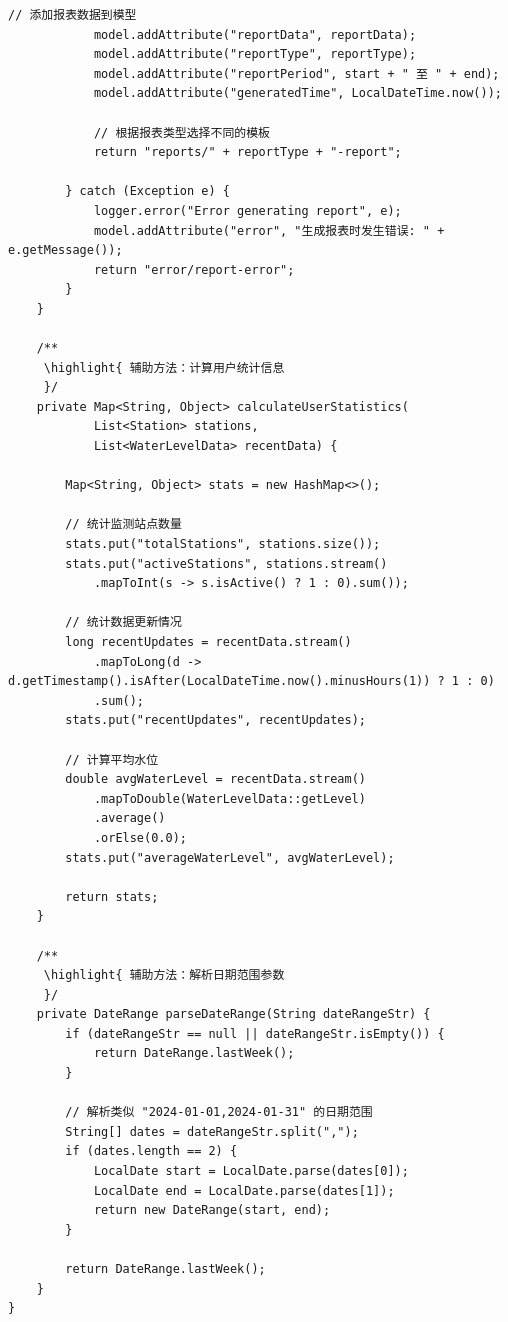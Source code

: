 \begin{lstlisting}[style=java]
            // 添加报表数据到模型
            model.addAttribute("reportData", reportData);
            model.addAttribute("reportType", reportType);
            model.addAttribute("reportPeriod", start + " 至 " + end);
            model.addAttribute("generatedTime", LocalDateTime.now());
            
            // 根据报表类型选择不同的模板
            return "reports/" + reportType + "-report";
            
        } catch (Exception e) {
            logger.error("Error generating report", e);
            model.addAttribute("error", "生成报表时发生错误: " + e.getMessage());
            return "error/report-error";
        }
    }
    
    /**
     \highlight{ 辅助方法：计算用户统计信息
     }/
    private Map<String, Object> calculateUserStatistics(
            List<Station> stations, 
            List<WaterLevelData> recentData) {
        
        Map<String, Object> stats = new HashMap<>();
        
        // 统计监测站点数量
        stats.put("totalStations", stations.size());
        stats.put("activeStations", stations.stream()
            .mapToInt(s -> s.isActive() ? 1 : 0).sum());
        
        // 统计数据更新情况
        long recentUpdates = recentData.stream()
            .mapToLong(d -> d.getTimestamp().isAfter(LocalDateTime.now().minusHours(1)) ? 1 : 0)
            .sum();
        stats.put("recentUpdates", recentUpdates);
        
        // 计算平均水位
        double avgWaterLevel = recentData.stream()
            .mapToDouble(WaterLevelData::getLevel)
            .average()
            .orElse(0.0);
        stats.put("averageWaterLevel", avgWaterLevel);
        
        return stats;
    }
    
    /**
     \highlight{ 辅助方法：解析日期范围参数
     }/
    private DateRange parseDateRange(String dateRangeStr) {
        if (dateRangeStr == null || dateRangeStr.isEmpty()) {
            return DateRange.lastWeek();
        }
        
        // 解析类似 "2024-01-01,2024-01-31" 的日期范围
        String[] dates = dateRangeStr.split(",");
        if (dates.length == 2) {
            LocalDate start = LocalDate.parse(dates[0]);
            LocalDate end = LocalDate.parse(dates[1]);
            return new DateRange(start, end);
        }
        
        return DateRange.lastWeek();
    }
}
\end{lstlisting}

